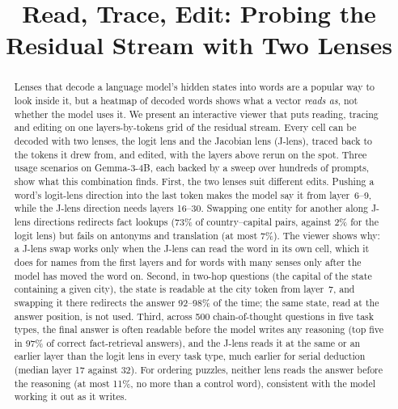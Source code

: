 \documentclass[11pt]{article}
\title{Read, Trace, Edit: Probing the Residual Stream with Two Lenses}
\author{}
\date{}
\begin{document}
\maketitle

\begin{abstract}
Lenses that decode a language model's hidden states into words are a popular way to look inside it, but a heatmap
of decoded words shows what a vector \emph{reads as}, not whether the model uses it. We present an interactive viewer
that puts reading, tracing and editing on one layers-by-tokens grid of the residual stream. Every cell can be decoded
with two lenses, the logit lens and the Jacobian lens (J-lens), traced back to the tokens it drew from, and edited,
with the layers above rerun on the spot. Three usage scenarios on Gemma-3-4B, each backed by a sweep over hundreds of
prompts, show what this combination finds. First, the two lenses suit different edits. Pushing a word's logit-lens
direction into the last token makes the model say it from layer~6--9, while the J-lens direction needs layers 16--30.
Swapping one entity for another along J-lens directions redirects fact lookups (73\% of country--capital pairs, against
2\% for the logit lens) but fails on antonyms and translation (at most 7\%). The viewer shows why: a J-lens swap works
only when the J-lens can read the word in its own cell, which it does for names from the first layers and for words
with many senses only after the model has moved the word on. Second, in two-hop questions (the capital of the state
containing a given city), the state is readable at the city token from layer~7, and swapping it there redirects the
answer 92--98\% of the time; the same state, read at the answer position, is not used. Third, across 500
chain-of-thought questions in five task types, the final answer is often readable before the model writes any
reasoning (top five in 97\% of correct fact-retrieval answers), and the J-lens reads it at the same or an earlier layer
than the logit lens in every task type, much earlier for serial deduction (median layer 17 against 32). For ordering
puzzles, neither lens reads the answer before the reasoning (at most 11\%, no more than a control word), consistent
with the model working it out as it writes.
\end{abstract}
\end{document}
